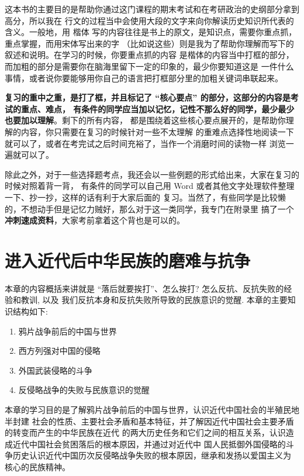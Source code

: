 \documentclass[10pt, UTF8]{book} %
\begin{document}
这本书的主要目的是帮助你通过这门课程的期末考试和在考研政治的史纲部分拿到高分，所以我在
行文的过程当中会使用大段的文字来向你解读历史知识所代表的含义。一般地，用 \kaishu 楷体
\songti 写的内容往往是书上的原文，是知识点，需要你重点抓，重点掌握，而用宋体写出来的字
（比如说这些）则是我为了帮助你理解而写下的叙述和说明。在学习的时候，你要重点抓的内容
是楷体的内容当中打框的部分，而加粗的部分是需要你在脑海里留下一定的印象的，最少你要知道这是
一件什么事情，或者说你要能够用你自己的语言把打框部分里的加粗关键词串联起来。

\textbf{复习的重中之重，是打了框，并且标记了 “核心要点” 的部分，这部分的内容是考试的重点、难点，
有条件的同学应当加以记忆，记性不那么好的同学，最少最少也要加以理解}。剩下的所有内容，
都是围绕着这些核心要点展开的，是帮助你理解的内容，你只需要在复习的时候针对一些不太理解
的重难点选择性地阅读一下就可以了，或者在考完试之后时间充裕了，当作一个消磨时间的读物一样
浏览一遍就可以了。

除此之外，对于一些选择题考点，我还会以一些例题的形式给出来，大家在复习的时候对照着背一背，
有条件的同学可以自己用 Word 或者其他文字处理软件整理一下、抄一抄，这样的话有利于大家后面的
复习。当然了，有些同学是比较懒的，不想动手但是记忆力贼好，那么对于这一类同学，我专门在附录里
搞了一个\textbf{冲刺速成资料}，大家考前拿着这个背也是可以的。

\newpage
\thispagestyle{empty}

\makeatletter
\let\ps@plain\ps@empty
\makeatother
\mainmatter

\chapter{进入近代后中华民族的磨难与抗争}
\thispagestyle{empty}

\quad\quad 本章的内容概括来讲就是 “落后就要挨打”、怎么挨打? 怎么反抗、反抗失败的经验和教训, 以及
我们反抗本身和反抗失败所导致的民族意识的觉醒. 本章的主要知识结构如下:
\begin{enumerate}[label=1.\arabic*, itemsep=0pt]
    \item 鸦片战争前后的中国与世界
    \item 西方列强对中国的侵略
    \item 外国武装侵略的斗争
    \item 反侵略战争的失败与民族意识的觉醒
\end{enumerate}
本章的学习目的是了解鸦片战争前后的中国与世界，认识近代中国社会的半殖民地半封建
社会的性质、主要社会矛盾和基本特征，并了解因近代中国社会主要矛盾的转变而产生的中华民族在近代
的两大历史任务和它们之间的相互关系，认识造成近代中国社会贫困落后的根本原因，并通过对近代中
国人民抵御外国侵略的斗争历史认识近代中国历次反侵略战争失败的根本原因，继承和发扬以爱国主义为
核心的民族精神。
\end{document}
